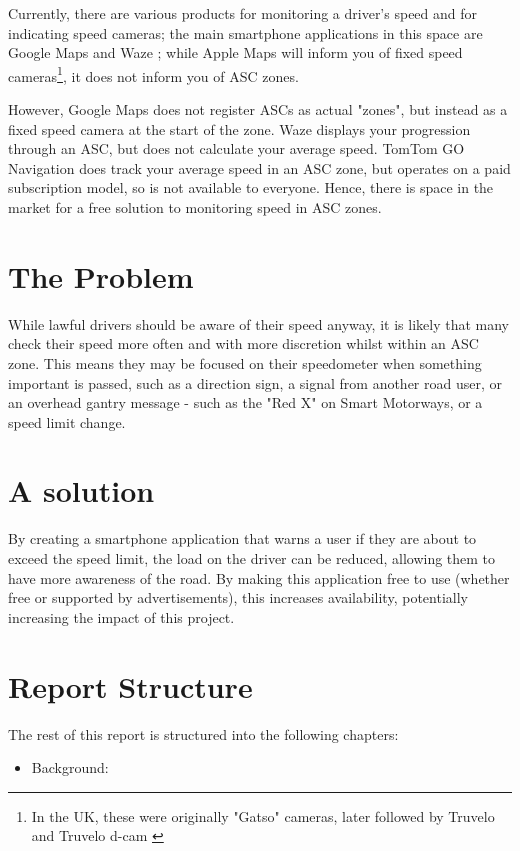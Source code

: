 \documentclass[11pt, a4paper, notitlepage]{report}
\begin{document}
Currently, there are various products for monitoring a driver's speed and for indicating speed cameras; the main smartphone applications in this space are Google Maps \citep{googleMaps} and Waze \citep{waze}; while Apple Maps \citep{appleMaps} will inform you of fixed speed cameras\footnote{In the UK, these were originally "Gatso" cameras, later followed by Truvelo and Truvelo d-cam \citep{dcam}}, it does not inform you of ASC zones.

However, Google Maps does not register ASCs as actual "zones", but instead as a fixed speed camera at the start of the zone. Waze displays your progression through an ASC, but does not calculate your average speed. TomTom GO Navigation \citep{tomtomGo} does track your average speed in an ASC zone, but operates on a paid subscription model, so is not available to everyone. Hence, there is space in the market for a free solution to monitoring speed in ASC zones.
\section{The Problem}
While lawful drivers should be aware of their speed anyway, it is likely that many check their speed more often and with more discretion whilst within an ASC zone. This means they may be focused on their speedometer when something important is passed, such as a direction sign, a signal from another road user, or an overhead gantry message - such as the "Red X" on Smart Motorways, or a speed limit change. 
\section{A solution}
By creating a smartphone application that warns a user if they are about to exceed the speed limit, the load on the driver can be reduced, allowing them to have more awareness of the road. By making this application free to use (whether free or supported by advertisements), this increases availability, potentially increasing the impact of this project.
\section{Report Structure}
The rest of this report is structured into the following chapters:
\begin{itemize}
	\item Background: 
\end{itemize}


\end{document}
